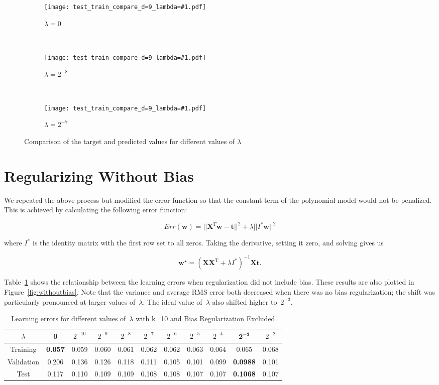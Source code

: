 \documentclass{report}
\newcommand{\wstar}{\mathbf{w}^{\star}}
\newcommand{\includeLambdaPlot}[3]{  
\begin{subfigure}[t]{#2}
  \centering
  \texttt{[image: test\_train\_compare\_d=9\_lambda=\#1.pdf]}
  \caption{$\lambda=#1$}\label{#3}
\end{subfigure}}
\begin{document}
  \begin{figure}[h]
    \centering
    \includeLambdaPlot{0}{0.3\textwidth}{fig:learnedZeroLambda}
    ~ 
    \includeLambdaPlot{2^{-8}}{0.3\textwidth}{fig:learnedTwoPowN8Lambda}
    ~
    \includeLambdaPlot{2^{-7}}{0.3\textwidth}{fig:learnedTwoPowN7Lambda}
    \caption{Comparison of the target and predicted values for different values of $\lambda$}\label{fig:learnerTargetAndPredicted}
  \end{figure}

  \section{Regularizing Without Bias}
  
  We repeated the above process but modified the error function so that the constant term of the polynomial model would not be penalized. This is achieved by calculating the following error function:
  
  \[ Err(\mathbf{w}) = ||\mathbf{X}^{T} \mathbf{w}-\mathbf{t}||^{2} + \lambda || I^* \mathbf{w}||^2\]
  
  \noindent
  where $I^{*}$ is the identity matrix with the first row set to all zeros.  Taking the derivative, setting it zero, and solving gives us
  
  \[ \wstar=(\mathbf{X}\mathbf{X}^{\text{T}} + \lambda I^{*})^{-1}\mathbf{X}\mathbf{t} \textrm{.}\]  
  
  Table~\ref{tab:noBiasRegularization} shows the relationship between the learning errors when regularization did not include bias.  These results are also plotted in Figure~\ref{fig:withoutbias}.  Note that the variance and average RMS error both decreased when there was no bias regularization; the shift was particularly pronounced at larger values of~$\lambda$.  The ideal value of~$\lambda$ also shifted higher to~$2^{-3}$.
  
  \begin{table}[b]
    \centering
    \caption{Learning errors for different values of~$\lambda$ with k=10 and Bias Regularization Excluded}\label{tab:noBiasRegularization}
    \begin{tabular}{c|c|c|c|c|c|c|c|c|c|c}
      \hline
      $\lambda$  & 0     & $2^{-10}$ & $2^{-9}$ & $2^{-8}$ & $2^{-7}$ & $2^{-6}$ & $2^{-5}$ & $2^{-4}$ & $\mathbf{2^{-3}}$ & $2^{-2}$ \\ \hline\hline
      Training   & \textbf{0.057} & 0.059      & 0.060     & 0.061     & 0.062     & 0.062    & 0.063   & 0.064  & 0.065  & 0.068 \\ \hline
      Validation & 0.206 & 0.136      & 0.126     & 0.118     & 0.111     & 0.105    & 0.101   & 0.099  & \textbf{0.0988} & 0.101 \\ \hline
      Test       & 0.117 & 0.110      & 0.109     & 0.109     & 0.108     & 0.108    & 0.107   & 0.107  & \textbf{0.1068} & 0.107 \\ \hline
    \end{tabular}
  \end{table}
  
\end{document}
